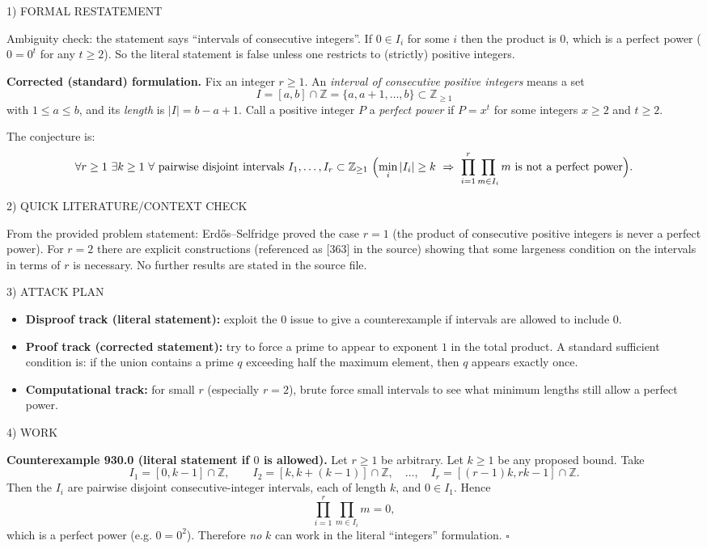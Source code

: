 
1) FORMAL RESTATEMENT

Ambiguity check: the statement says ``intervals of consecutive integers''. If $0\in I_i$ for some $i$ then the product is $0$, which is a perfect power ($0=0^t$ for any $t\ge 2$). So the literal statement is false unless one restricts to (strictly) positive integers.

\medskip
\noindent\textbf{Corrected (standard) formulation.}
Fix an integer $r\ge 1$. An \emph{interval of consecutive positive integers} means a set
\[
I=[a,b]\cap\mathbb Z=\{a,a+1,\dots,b\}\subset\mathbb Z_{\ge 1}
\]
with $1\le a\le b$, and its \emph{length} is $|I|=b-a+1$.
Call a positive integer $P$ a \emph{perfect power} if $P=x^t$ for some integers $x\ge 2$ and $t\ge 2$.

The conjecture is:
\[
\forall r\ge 1\ \exists k\ge 1\ \forall\text{ pairwise disjoint intervals }I_1,\dots,I_r\subset\mathbb Z_{\ge1}
\ \Bigl(\min_i |I_i|\ge k\ \Rightarrow\ \prod_{i=1}^r\prod_{m\in I_i} m\ \text{is not a perfect power}\Bigr).
\]

2) QUICK LITERATURE/CONTEXT CHECK

From the provided problem statement: Erd\H{o}s--Selfridge proved the case $r=1$ (the product of consecutive positive integers is never a perfect power). For $r=2$ there are explicit constructions (referenced as [363] in the source) showing that some largeness condition on the intervals in terms of $r$ is necessary. No further results are stated in the source file.

3) ATTACK PLAN

\begin{itemize}
\item \textbf{Disproof track (literal statement):} exploit the $0$ issue to give a counterexample if intervals are allowed to include $0$.
\item \textbf{Proof track (corrected statement):} try to force a prime to appear to exponent $1$ in the total product. A standard sufficient condition is: if the union contains a prime $q$ exceeding half the maximum element, then $q$ appears exactly once.
\item \textbf{Computational track:} for small $r$ (especially $r=2$), brute force small intervals to see what minimum lengths still allow a perfect power.
\end{itemize}

4) WORK

\textbf{Counterexample 930.0 (literal statement if $0$ is allowed).}
Let $r\ge 1$ be arbitrary. Let $k\ge 1$ be any proposed bound. Take
\[
I_1=[0,k-1]\cap\mathbb Z,\qquad I_2=[k,k+(k-1)]\cap\mathbb Z,\quad\dots,\quad I_r=[(r-1)k,rk-1]\cap\mathbb Z.
\]
Then the $I_i$ are pairwise disjoint consecutive-integer intervals, each of length $k$, and $0\in I_1$. Hence
\[
\prod_{i=1}^r\prod_{m\in I_i} m = 0,
\]
which is a perfect power (e.g. $0=0^2$). Therefore \emph{no} $k$ can work in the literal ``integers'' formulation.
\hfill$\square$

